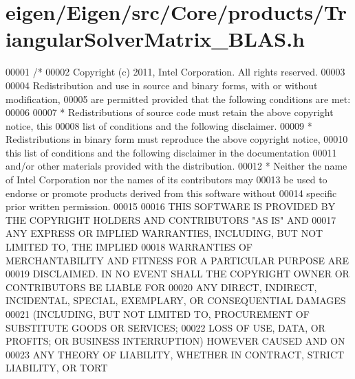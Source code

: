 \hypertarget{eigen_2_eigen_2src_2_core_2products_2_triangular_solver_matrix___b_l_a_s_8h_source}{}\section{eigen/\+Eigen/src/\+Core/products/\+Triangular\+Solver\+Matrix\+\_\+\+B\+L\+AS.h}
\label{eigen_2_eigen_2src_2_core_2products_2_triangular_solver_matrix___b_l_a_s_8h_source}

\begin{DoxyCode}
00001 \textcolor{comment}{/*}
00002 \textcolor{comment}{ Copyright (c) 2011, Intel Corporation. All rights reserved.}
00003 \textcolor{comment}{}
00004 \textcolor{comment}{ Redistribution and use in source and binary forms, with or without modification,}
00005 \textcolor{comment}{ are permitted provided that the following conditions are met:}
00006 \textcolor{comment}{}
00007 \textcolor{comment}{ * Redistributions of source code must retain the above copyright notice, this}
00008 \textcolor{comment}{   list of conditions and the following disclaimer.}
00009 \textcolor{comment}{ * Redistributions in binary form must reproduce the above copyright notice,}
00010 \textcolor{comment}{   this list of conditions and the following disclaimer in the documentation}
00011 \textcolor{comment}{   and/or other materials provided with the distribution.}
00012 \textcolor{comment}{ * Neither the name of Intel Corporation nor the names of its contributors may}
00013 \textcolor{comment}{   be used to endorse or promote products derived from this software without}
00014 \textcolor{comment}{   specific prior written permission.}
00015 \textcolor{comment}{}
00016 \textcolor{comment}{ THIS SOFTWARE IS PROVIDED BY THE COPYRIGHT HOLDERS AND CONTRIBUTORS "AS IS" AND}
00017 \textcolor{comment}{ ANY EXPRESS OR IMPLIED WARRANTIES, INCLUDING, BUT NOT LIMITED TO, THE IMPLIED}
00018 \textcolor{comment}{ WARRANTIES OF MERCHANTABILITY AND FITNESS FOR A PARTICULAR PURPOSE ARE}
00019 \textcolor{comment}{ DISCLAIMED. IN NO EVENT SHALL THE COPYRIGHT OWNER OR CONTRIBUTORS BE LIABLE FOR}
00020 \textcolor{comment}{ ANY DIRECT, INDIRECT, INCIDENTAL, SPECIAL, EXEMPLARY, OR CONSEQUENTIAL DAMAGES}
00021 \textcolor{comment}{ (INCLUDING, BUT NOT LIMITED TO, PROCUREMENT OF SUBSTITUTE GOODS OR SERVICES;}
00022 \textcolor{comment}{ LOSS OF USE, DATA, OR PROFITS; OR BUSINESS INTERRUPTION) HOWEVER CAUSED AND ON}
00023 \textcolor{comment}{ ANY THEORY OF LIABILITY, WHETHER IN CONTRACT, STRICT LIABILITY, OR TORT}

\end{DoxyCode}
